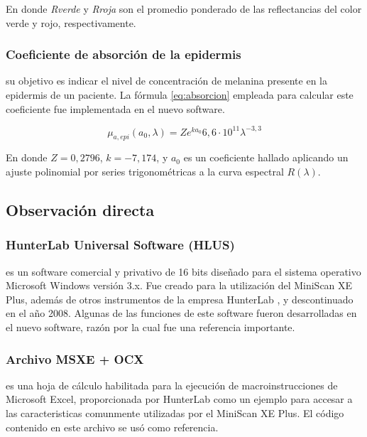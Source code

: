 \documentclass[conference]{IEEEtran}
\begin{document}
		En donde \textit{Rverde} y \textit{Rroja} son el promedio ponderado de las reflectancias del color verde y rojo, respectivamente.
		
		\subsubsection{Coeficiente de absorci\'{o}n de la epidermis}
			 su objetivo es indicar el nivel de concentraci\'{o}n de melanina presente en la epidermis de un paciente. La f\'{o}rmula \ref{eq:absorcion} empleada para calcular este coeficiente \cite{Narea} fue implementada en el nuevo software.
			 
		\begin{equation}\label{eq:absorcion}
			\mu_{a,epi}(a_{0}, \lambda)=Ze^{ka_{0}}6,6 \cdot 10^{11}\lambda^{-3,3}
		\end{equation}
		
		En donde $Z=0,2796$, $k=-7,174$, y $a_{0}$ es un coeficiente hallado aplicando un ajuste polinomial por series trigonom\'{e}tricas a la curva espectral $R(\lambda)$.
	
	\subsection{Observaci\'{o}n directa}

		\subsubsection{HunterLab Universal Software (HLUS)}
			es un software \mbox{comercial} y privativo de 16 bits dise\~{n}ado para el sistema \mbox{operativo} Microsoft Windows versi\'{o}n 3.x. Fue creado para la utilizaci\'{o}n del \mbox{MiniScan} XE Plus, adem\'{a}s de otros instrumentos de la empresa \mbox{HunterLab} \cite{HunterLab-manual}, y descontinuado en el a\~{n}o 2008. Algunas de las funciones de este software fueron desarrolladas en el nuevo software, raz\'{o}n por la cual fue una referencia importante.
		
		\subsubsection{Archivo MSXE + OCX}
		es una hoja de c\'{a}lculo habilitada para la ejecuci\'{o}n de macroinstrucciones de Microsoft Excel, proporcionada por HunterLab \cite{HunterLab} como un ejemplo para accesar a las caracteristicas comunmente utilizadas por el MiniScan XE Plus. El c\'{o}digo contenido en este archivo se us\'{o} como referencia.
	
\end{document}
